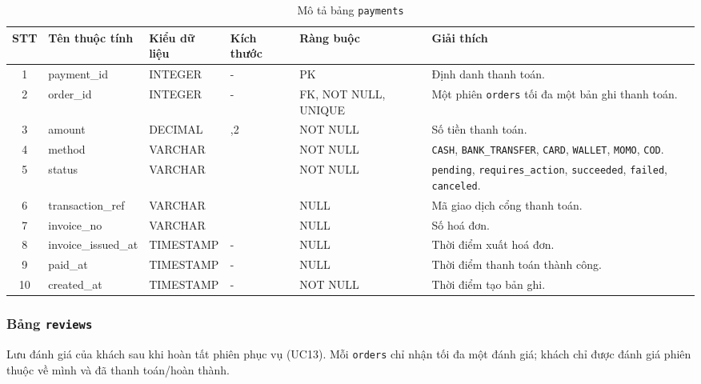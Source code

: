 \documentclass[../DoAn.tex]{subfiles}
\begin{document}
\begin{table}[H]
\centering
\renewcommand{\arraystretch}{1.3}
\small
\begin{tabularx}{\textwidth}{|c|>{\RaggedRight\arraybackslash}p{2.9cm}|>{\Centering\arraybackslash}p{2.2cm}|>{\Centering\arraybackslash}p{1.3cm}|>{\Centering\arraybackslash}p{2.2cm}|>{\RaggedRight\arraybackslash}X|}
\hline
\textbf{STT} & \textbf{Tên thuộc tính} & \textbf{Kiểu dữ liệu} & \textbf{Kích thước} & \textbf{Ràng buộc} & \textbf{Giải thích} \\
\hline
1 & payment\_id & INTEGER & - & PK & Định danh thanh toán. \\ \hline
2 & order\_id & INTEGER & - & FK, NOT NULL, UNIQUE & Một phiên \texttt{orders} tối đa một bản ghi thanh toán. \\ \hline
3 & amount & DECIMAL & 10,2 & NOT NULL & Số tiền thanh toán. \\ \hline
4 & method & VARCHAR & 15 & NOT NULL & \texttt{CASH}, \texttt{BANK\_TRANSFER}, \texttt{CARD}, \texttt{WALLET}, \texttt{MOMO}, \texttt{COD}. \\ \hline
5 & status & VARCHAR & 16 & NOT NULL & \texttt{pending}, \texttt{requires\_action}, \texttt{succeeded}, \texttt{failed}, \texttt{canceled}. \\ \hline
6 & transaction\_ref & VARCHAR & 64 & NULL & Mã giao dịch cổng thanh toán. \\ \hline
7 & invoice\_no & VARCHAR & 20 & NULL & Số hoá đơn. \\ \hline
8 & invoice\_issued\_at & TIMESTAMP & - & NULL & Thời điểm xuất hoá đơn. \\ \hline
9 & paid\_at & TIMESTAMP & - & NULL & Thời điểm thanh toán thành công. \\ \hline
10 & created\_at & TIMESTAMP & - & NOT NULL & Thời điểm tạo bản ghi. \\ \hline
\end{tabularx}
\caption{Mô tả bảng \texttt{payments}}
\end{table}

\subsubsection{Bảng \texttt{reviews}}

Lưu đánh giá của khách sau khi hoàn tất phiên phục vụ (UC13). Mỗi \texttt{orders} chỉ nhận tối đa một đánh giá;
khách chỉ được đánh giá phiên thuộc về mình và đã thanh toán/hoàn thành.
\end{document}
